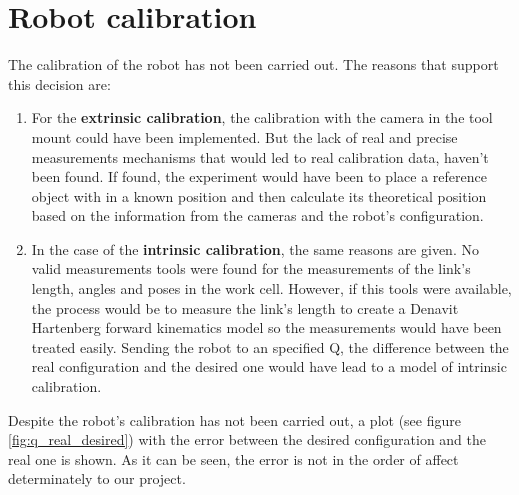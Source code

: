 \section{Robot calibration} %
\label{sec:robot_calibration}
The calibration of the robot has not been carried out. The reasons that support this decision are:
\begin{enumerate}
	\item For the \textbf{extrinsic calibration}, the calibration with the camera in the tool mount could have been implemented. But the lack of real and precise measurements mechanisms that would led to real calibration data, haven't been found. If found, the experiment would have been to place a reference object with in a known position and then calculate its theoretical position based on the information from the cameras and the robot's configuration.
	\item In the case of the \textbf{intrinsic calibration}, the same reasons are given. No valid measurements tools were found for the measurements of the link's length, angles and poses in the work cell. However, if this tools were available, the process would be to measure the link's length to create a Denavit Hartenberg forward kinematics model so the measurements would have been treated easily. Sending the robot to an specified Q, the difference between the real configuration and the desired one would have lead to a model of intrinsic calibration.
\end{enumerate}

Despite the robot's calibration has not been carried out, a plot (see figure \ref{fig:q_real_desired}) with the error between the desired configuration and the real one is shown. As it can be seen, the error is not in the order of affect determinately to our project.

